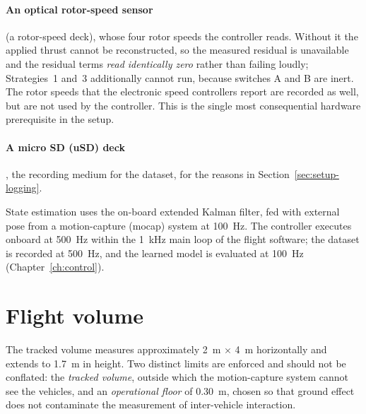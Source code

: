 \paragraph{An optical rotor-speed sensor} (a rotor-speed deck), whose four rotor speeds the
controller reads. Without it the applied thrust cannot be reconstructed, so the measured residual
is unavailable and the residual terms \emph{read identically zero} rather than failing loudly;
Strategies~1 and~3 additionally cannot run, because switches A and B are inert. The rotor speeds
that the electronic speed controllers report are recorded as well, but are not used by the
controller. This is the single most consequential hardware prerequisite in the setup.

\paragraph{A micro SD (uSD) deck}, the recording medium for the dataset, for the reasons in
Section~\ref{sec:setup-logging}.

State estimation uses the on-board extended Kalman filter, fed with external pose from a
motion-capture (mocap) system at \SI{100}{\hertz}. The controller executes onboard at
\SI{500}{\hertz} within the \SI{1}{\kilo\hertz} main loop of the flight software; the dataset is
recorded at \SI{500}{\hertz}, and the learned model is evaluated at \SI{100}{\hertz}
(Chapter~\ref{ch:control}).

\section{Flight volume}
\label{sec:setup-volume}

The tracked volume measures approximately \SI{2}{\metre} $\times$ \SI{4}{\metre} horizontally and
extends to \SI{1.7}{\metre} in height. Two distinct limits are enforced and should not be
conflated: the \emph{tracked volume}, outside which the motion-capture system cannot see the
vehicles, and an \emph{operational floor} of \SI{0.30}{\metre}, chosen so that ground effect does
not contaminate the measurement of inter-vehicle interaction.

